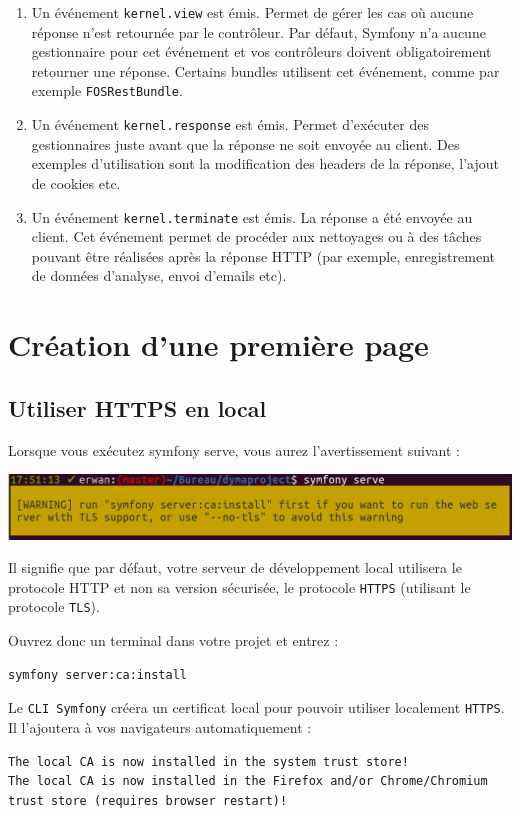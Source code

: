\documentclass{article}
\begin{document}
\begin{enumerate}
\item  Un événement {\tt kernel.view} est émis. Permet de gérer les cas où aucune réponse n'est retournée par le contrôleur. Par défaut, Symfony n'a aucune gestionnaire pour cet événement et vos contrôleurs doivent obligatoirement retourner une réponse. Certains bundles utilisent cet événement, comme par exemple {\tt FOSRestBundle}.

\item  Un événement {\tt kernel.response} est émis. Permet d'exécuter des gestionnaires juste avant que la réponse ne soit envoyée au client. Des exemples d'utilisation sont la modification des headers de la réponse, l'ajout de cookies etc.

\item  Un événement {\tt kernel.terminate} est émis. La réponse a été envoyée au client. Cet événement permet de procéder aux nettoyages ou à des tâches pouvant être réalisées après la réponse HTTP (par exemple, enregistrement de données d'analyse, envoi d'emails etc).
\end{enumerate}


\section{Création d'une première page}
\subsection{Utiliser HTTPS en local}
Lorsque vous exécutez symfony serve, vous aurez l'avertissement suivant :
\begin{center}
\includegraphics[width=15cm]{images/image6.png}
\end{center}

Il signifie que par défaut, votre serveur de développement local utilisera le protocole HTTP et non sa version sécurisée, le protocole {\tt HTTPS} (utilisant le protocole {\tt TLS}).

Ouvrez donc un terminal dans votre projet et entrez :
\begin{verbatim}
symfony server:ca:install
\end{verbatim}

Le {\tt CLI Symfony} créera un certificat local pour pouvoir utiliser localement {\tt HTTPS}. Il l'ajoutera à vos navigateurs automatiquement :
\begin{verbatim}
The local CA is now installed in the system trust store!
The local CA is now installed in the Firefox and/or Chrome/Chromium trust store (requires browser restart)!
\end{verbatim}
\end{document}
